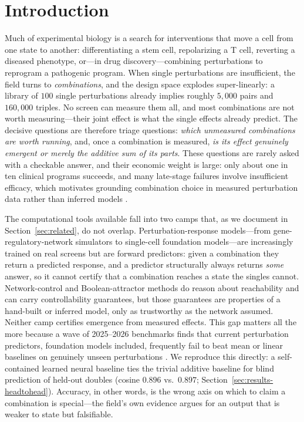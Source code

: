 \section{Introduction}
\label{sec:intro}

Much of experimental biology is a search for interventions that move a cell from one state to
another: differentiating a stem cell, repolarizing a T cell, reverting a diseased phenotype,
or---in drug discovery---combining perturbations to reprogram a pathogenic program. When single
perturbations are insufficient, the field turns to \emph{combinations}, and the design space
explodes super-linearly: a library of $100$ single perturbations already implies roughly
$5{,}000$ pairs and $160{,}000$ triples. No screen can measure them all, and most combinations
are not worth measuring---their joint effect is what the single effects already predict. The
decisive questions are therefore triage questions: \emph{which unmeasured combinations are worth
running}, and, once a combination is measured, \emph{is its effect genuinely emergent or merely
the additive sum of its parts}. These questions are rarely asked with a checkable answer, and
their economic weight is large: only about one in ten clinical programs succeeds, and many
late-stage failures involve insufficient efficacy, which motivates grounding combination choice
in measured perturbation data rather than inferred models
\citep{Minikel2024,Nelson2015,Harrison2016,BegleyEllis2012,Prinz2011}.

The computational tools available fall into two camps that, as we document in
Section~\ref{sec:related}, do not overlap. Perturbation-response models---from
gene-regulatory-network simulators to single-cell foundation models---are increasingly trained
on real screens but are forward predictors: given a combination they return a predicted response,
and a predictor structurally always returns \emph{some} answer, so it cannot certify that a
combination reaches a state the singles cannot. Network-control and Boolean-attractor methods do
reason about reachability and can carry controllability guarantees, but those guarantees are
properties of a hand-built or inferred model, only as trustworthy as the network assumed. Neither
camp certifies emergence from measured effects. This gap matters all the more because a wave of
2025--2026 benchmarks finds that current perturbation predictors, foundation models included,
frequently fail to beat mean or linear baselines on genuinely unseen perturbations
\citep{AhlmannEltze2025,Wong2025,Kernfeld2025,Atti2025}. We reproduce this directly: a
self-contained learned neural baseline ties the trivial additive baseline for blind prediction of
held-out doubles (cosine $0.896$ vs.\ $0.897$; Section~\ref{sec:results-headtohead}). Accuracy,
in other words, is the wrong axis on which to claim a combination is special---the field's own
evidence argues for an output that is weaker to state but falsifiable.

